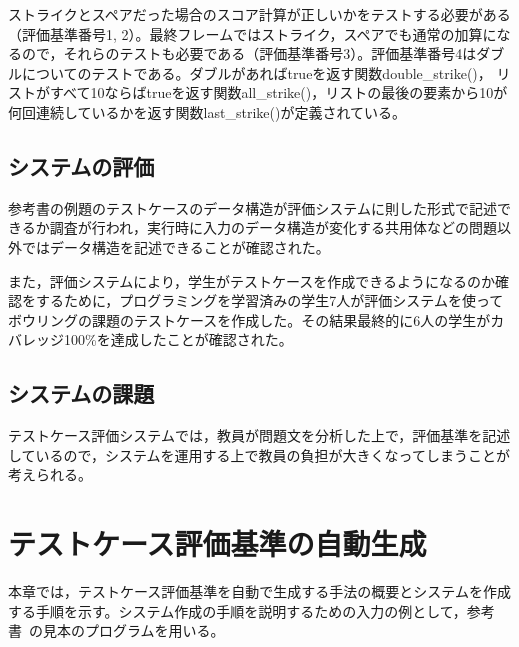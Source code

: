\documentclass{tpu-sotu}
\begin{document}
ストライクとスペアだった場合のスコア計算が正しいかをテストする必要がある（評価基準番号1, 2）。最終フレームではストライク，スペアでも通常の加算になるので，それらのテストも必要である（評価基準番号3）。評価基準番号4はダブルについてのテストである。ダブルがあればtrueを返す関数double\_strike()， リストがすべて10ならばtrueを返す関数all\_strike()，リストの最後の要素から10が何回連続しているかを返す関数last\_strike()が定義されている。
\section{システムの評価}
参考書の例題のテストケースのデータ構造が評価システムに則した形式で記述できるか調査が行われ，実行時に入力のデータ構造が変化する共用体などの問題以外ではデータ構造を記述できることが確認された。

また，評価システムにより，学生がテストケースを作成できるようになるのか確認をするために，プログラミングを学習済みの学生7人が評価システムを使ってボウリングの課題のテストケースを作成した。その結果最終的に6人の学生がカバレッジ100\%を達成したことが確認された。

\section{システムの課題}
テストケース評価システムでは，教員が問題文を分析した上で，評価基準を記述しているので，システムを運用する上で教員の負担が大きくなってしまうことが考えられる。

\chapter{テストケース評価基準の自動生成}
本章では，テストケース評価基準を自動で生成する手法の概要とシステムを作成する手順を示す。システム作成の手順を説明するための入力の例として，参考書~\cite{b1}の見本のプログラムを用いる。
\end{document}
